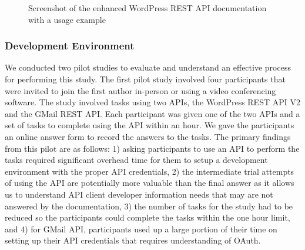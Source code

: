 \documentclass[conference]{IEEEtran}
\begin{document}
\begin{figure}[tb]
\begin{center}
\end{center}
\caption{Screenshot of the enhanced WordPress REST API documentation with a usage example}
\label{fig:enhanced}
\end{figure}


\subsubsection{Development Environment}

We conducted two pilot studies to evaluate and understand an effective process for performing this study. The first pilot study involved four participants that were invited to join the first author in-person or using a video conferencing software. The study involved tasks using two APIs, the WordPress REST API V2 and the GMail REST API. Each participant was given one of the two APIs and a set of tasks to complete using the API within an hour. We gave the participants an online answer form to record the answers to the tasks. The primary findings from this pilot are as follows: 1) asking participants to use an API to perform the tasks required significant overhead time for them to setup a development environment with the proper API credentials, 2) the intermediate trial attempts of using the API are potentially more valuable than the final answer as it allows us to understand API client developer information needs that may are not answered by the documentation, 3) the number of tasks for the study had to be reduced so the participants could complete the tasks within the one hour limit, and 4) for GMail API, participants used up a large portion of their time on setting up their API credentials that requires understanding of OAuth.
\end{document}
